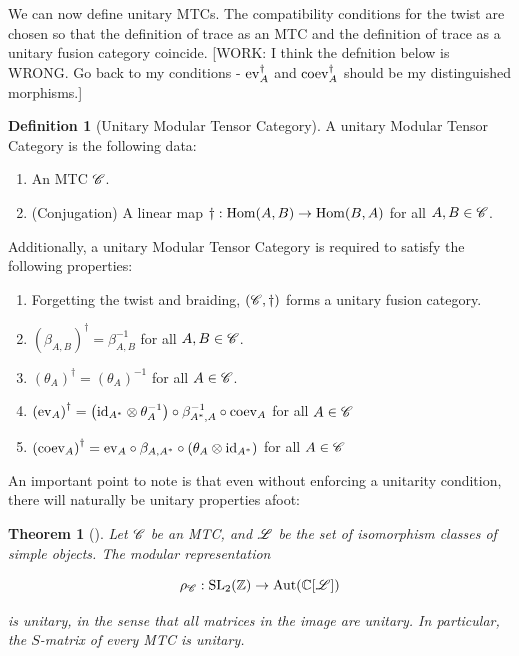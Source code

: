 \documentclass{article}
\newtheorem{theorem}{Theorem}[section]
\theoremstyle{definition}
\newtheorem*{definition}{Definition}
\numberwithin{figure}{section}
\begin{document}
We can now define unitary MTCs. The compatibility conditions for the twist are chosen so that the definition of trace as an MTC and the definition of trace as a unitary fusion category coincide. [WORK: I think the defnition below is WRONG. Go back to my conditions - $\mathrm{ev}_A^\dagger$ and $\mathrm{coev}_A^\dagger$ should be my distinguished morphisms.]

\begin{definition}[Unitary Modular Tensor Category] A unitary Modular Tensor Category is the following data:

\begin{enumerate}
\item An MTC $\mathscr{C}$.
\item (Conjugation) A linear map $\dagger: \mathrm{Hom}(A,B)\to \mathrm{Hom}(B,A)$ for all $A,B\in \mathscr{C}$.
\end{enumerate}

Additionally, a unitary Modular Tensor Category is required to satisfy the following properties:

\begin{enumerate}
\item Forgetting the twist and braiding, $\left(\mathscr{C},\dagger\right)$ forms a unitary fusion category.
\item $\left(\beta_{A,B}\right)^{\dagger}=\beta_{A,B}^{-1}$ for all $A,B\in \mathscr{C}$.
\item $\left(\theta_A\right)^{\dagger}=\left(\theta_A\right)^{-1}$ for all $A\in \mathscr{C}$.
\item $\left(\mathrm{ev}_{A}\right)^{\dagger}= \left(\mathrm{id}_{A^*}\otimes \theta_A^{-1}\right)\circ \beta_{A^*,A}^{-1}\circ \mathrm{coev}_A$ for all $A\in \mathscr{C}$
\item $\left(\mathrm{coev}_{A}\right)^{\dagger}= \mathrm{ev}_{A}\circ\beta_{A,A^*}\circ\left(\theta_A \otimes \mathrm{id}_{A^*}\right)$ for all $A\in \mathscr{C}$
\end{enumerate}

\raggedleft\qedsymbol{}
\end{definition}

An important point to note is that even without enforcing a unitarity condition, there will naturally be unitary properties afoot:

\begin{theorem}[\cite{etingof2005fusion}] Let $\mathscr{C}$ be an MTC, and $\mathscr{L}$ be the set of isomorphism classes of simple objects. The modular representation

$$\rho_{\mathscr{C}}:\mathrm{SL}_2(\mathbb{Z})\to \mathrm{Aut}(\mathbb{C}[\mathscr{L}])$$

is unitary, in the sense that all matrices in the image are unitary. In particular, the $S$-matrix of every MTC is unitary.
\end{theorem}
\end{document}
